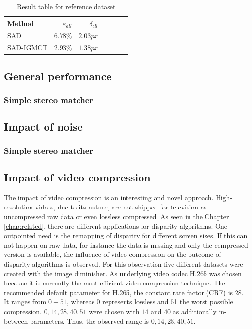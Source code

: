 \begin{table}[h!]
\centering
\begin{tabular}{l|rrrrrr}
  \hline
  \textbf{Method} & $\varepsilon_{all}$ & $\delta_{all}$ \\ \hline \hline
  SAD & $6.78\%$ & $2.03px$ \\ \hline
  SAD-IGMCT & $2.93\%$ & $1.38px$ \\ \hline
\end{tabular}
\caption{Result table for reference dataset}
\label{tab:eval:snsm:tsukuba}
\end{table}

\subsection{General performance}

\subsubsection{Simple stereo matcher}

\subsection{Impact of noise}

\subsubsection{Simple stereo matcher}

\subsection{Impact of video compression}

The impact of video compression is an interesting and novel approach.
High-resolution videos, due to its nature, are not shipped for television as uncompressed raw data or even lossless compressed.
As seen in the Chapter \ref{chap:related}, there are different applications for disparity algorithms.
One outpointed need is the remapping of disparity for different screen sizes.
If this can not happen on raw data, for instance the data is missing and only the compressed version is available, the influence of video compression on the outcome of disparity algorithms is observed.
\newline\newline\noindent For this observation five different datasets were created with the image diminisher.
As underlying video codec H.265 was chosen because it is currently the most efficient video compression technique.
The recommended default parameter for H.265, the constant rate factor (CRF) is 28.
It ranges from $0-51$, whereas 0 represents lossless and 51 the worst possible compression.
$0, 14, 28, 40, 51$ were chosen with $14$ and $40$ as additionally in-between parameters.
Thus, the observed range is $0, 14, 28, 40, 51$.

